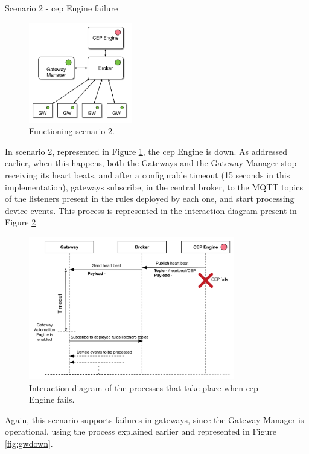 \begin{Paragraph}{Scenario 2 - \ac{cep} Engine failure}
\begin{figure}[H]
	\centering
	\includegraphics[width=0.4\textwidth]{figures/fs2.png}
	\caption{Functioning scenario 2.}
	\label{fig:fs2}
\end{figure}

In scenario 2, represented in Figure \ref{fig:fs2}, the \ac{cep} Engine is down. As addressed earlier, when this happens, both the Gateways and the Gateway Manager stop receiving its heart beats, and after a configurable timeout (15 seconds in this implementation), gateways subscribe, in the central broker, to the MQTT topics of the listeners present in the rules deployed by each one, and start processing device events. This process is represented in the interaction diagram present in Figure \ref{fig:gae}

\begin{figure}[H]
	\centering
	\includegraphics[width=0.8\textwidth]{figures/gae.png}
	\caption{Interaction diagram of the processes that take place when \ac{cep} Engine fails.}
	\label{fig:gae}
\end{figure}

Again, this scenario supports failures in gateways, since the Gateway Manager is operational, using the process explained earlier and represented in Figure \ref{fig:gwdown}.

\end{Paragraph}

